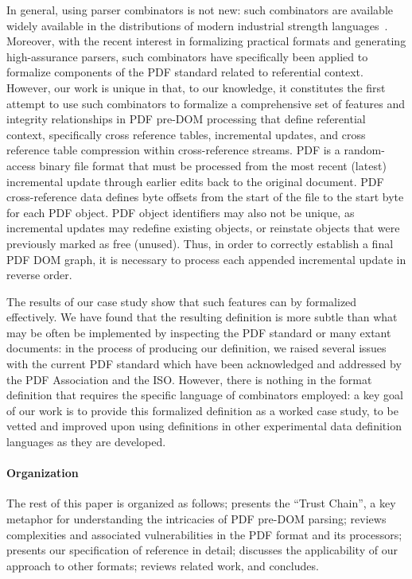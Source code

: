 In general, using parser combinators is not new: such combinators are
available widely available in the distributions of modern industrial
strength languages~\cite{leijen2001parsec,couprie2015nom,mundkurResearchReportParsley2020,bratus2017curing,willis2020staged}.
%
Moreover, with the recent interest in formalizing practical formats
and generating high-assurance parsers, such combinators have
specifically been applied to formalize components of the
PDF standard related to referential context.
%
However, our work is unique in that, to our knowledge, it constitutes
the first attempt to use such combinators to formalize a comprehensive
set of features and integrity relationships in PDF pre-DOM processing
that define referential context, specifically cross reference tables,
incremental updates, and cross reference table compression within
cross-reference streams. PDF is a random-access binary file format
that must be processed from the most recent (latest) incremental
update through earlier edits back to the original document.
%
PDF cross-reference data defines byte offsets from the start of the
file to the start byte for each PDF object. PDF object identifiers may
also not be unique, as incremental updates may redefine existing
objects, or reinstate objects that were previously marked as free
(unused).
%
Thus, in order to correctly establish a final PDF DOM graph, it is
necessary to process each appended incremental update in reverse
order.

The results of our case study show that such features can by
formalized effectively.
%
We have found that the resulting definition is more subtle than what
may be often be implemented by inspecting the PDF standard or many
extant documents: in the process of producing our definition, we
raised several issues with the current PDF standard which have been
acknowledged and addressed by the PDF Association and the ISO.
%
However, there is nothing in the format definition that requires the
specific language of combinators employed: a key goal of our work is
to provide this formalized definition as a worked case study, to be
vetted and improved upon using definitions in other experimental data
definition languages as they are developed.


\paragraph*{Organization} The rest of this paper is organized as
follows;
%
 presents the ``Trust Chain'', a key metaphor
for understanding the intricacies of PDF pre-DOM parsing;
%
 reviews complexities and associated vulnerabilities in
the PDF format and its processors;
%
 presents our specification of reference in
detail;
%
 discusses the applicability of our approach
to other formats; 
%
 reviews related work, and %
 concludes.

